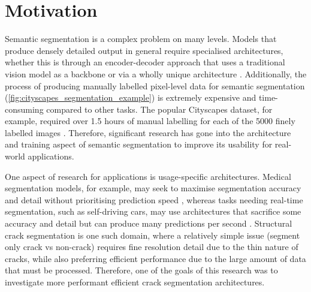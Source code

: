 \documentclass[a4paper,12pt]{report}
\begin{document}
\section{Motivation}
Semantic segmentation is a complex problem on many levels. Models that produce densely detailed output in general require specialised architectures, whether this is through an encoder-decoder approach that uses a traditional vision model as a backbone \cite{chen_deeplab_2017} or via a wholly unique architecture \cite{yu_bisenet_2018}. Additionally, the process of producing manually labelled pixel-level data for semantic segmentation (\autoref{fig:cityscapes_segmentation_example}) is extremely expensive and time-consuming compared to other tasks. The popular Cityscapes dataset, for example, required over 1.5 hours of manual labelling for each of the 5000 finely labelled images \cite{cordts_cityscapes_2016}. Therefore, significant research has gone into the architecture and training aspect of semantic segmentation to improve its usability for real-world applications.

One aspect of research for applications is usage-specific architectures. Medical segmentation models, for example, may seek to maximise segmentation accuracy and detail without prioritising prediction speed \cite{ronneberger_u-net_2015}, whereas tasks needing real-time segmentation, such as self-driving cars, may use architectures that sacrifice some accuracy and detail but can produce many predictions per second \cite{poudel_fast-scnn_2019}. Structural crack segmentation is one such domain, where a relatively simple issue (segment only crack vs non-crack) requires fine resolution detail due to the thin nature of cracks, while also preferring efficient performance due to the large amount of data that must be processed. Therefore, one of the goals of this research was to investigate more performant efficient crack segmentation architectures.
\end{document}

